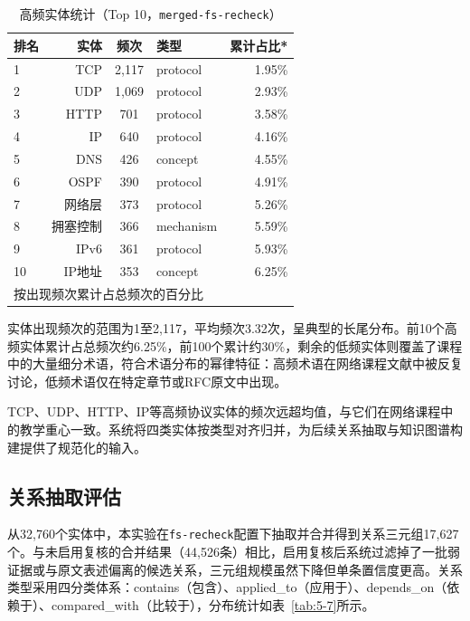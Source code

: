 \begin{table}[ht]
    \centering
    \caption{高频实体统计（Top 10，\texttt{merged-fs-recheck}）}
    \label{tab:5-6}
    \begin{tabular}{lrclr}
    \toprule
    \textbf{排名} & \textbf{实体} & \textbf{频次} & \textbf{类型} & \textbf{累计占比*} \\
    \midrule
    1 & TCP & 2,117 & protocol & 1.95\% \\
    2 & UDP & 1,069 & protocol & 2.93\% \\
    3 & HTTP & 701 & protocol & 3.58\% \\
    4 & IP & 640 & protocol & 4.16\% \\
    5 & DNS & 426 & concept & 4.55\% \\
    6 & OSPF & 390 & protocol & 4.91\% \\
    7 & 网络层 & 373 & protocol & 5.26\% \\
    8 & 拥塞控制 & 366 & mechanism & 5.59\% \\
    9 & IPv6 & 361 & protocol & 5.93\% \\
    10 & IP地址 & 353 & concept & 6.25\% \\
    \bottomrule
    \multicolumn{5}{l}{\small *按出现频次累计占总频次的百分比}
    \end{tabular}
\end{table}

实体出现频次的范围为1至2,117，平均频次3.32次，呈典型的长尾分布。前10个高频实体累计占总频次约6.25\%，前100个累计约30\%，剩余的低频实体则覆盖了课程中的大量细分术语，符合术语分布的幂律特征：高频术语在网络课程文献中被反复讨论，低频术语仅在特定章节或RFC原文中出现。

TCP、UDP、HTTP、IP等高频协议实体的频次远超均值，与它们在网络课程中的教学重心一致。系统将四类实体按类型对齐归并，为后续关系抽取与知识图谱构建提供了规范化的输入。

\subsection{关系抽取评估}

从32,760个实体中，本实验在\texttt{fs-recheck}配置下抽取并合并得到关系三元组17,627个。与未启用复核的合并结果（44,526条）相比，启用复核后系统过滤掉了一批弱证据或与原文表述偏离的候选关系，三元组规模虽然下降但单条置信度更高。关系类型采用四分类体系：contains（包含）、applied\_to（应用于）、depends\_on（依赖于）、compared\_with（比较于），分布统计如表~\ref{tab:5-7}所示。

